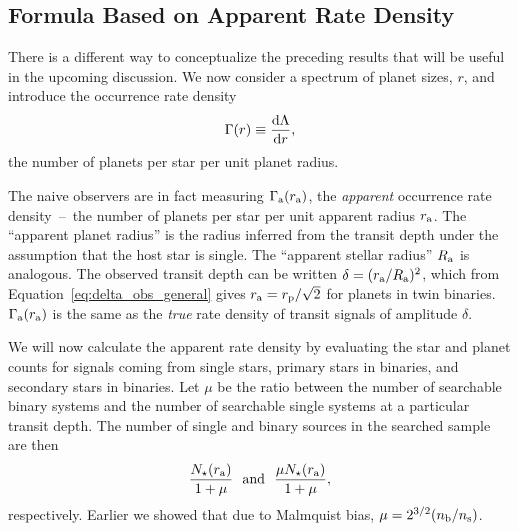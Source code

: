 \documentclass[12pt,modern]{aastex61}
\renewcommand{\a}{_{\rm a}}
\newcommand{\s}{_{\rm s}}
\newcommand{\p}{_{\rm p}}
\renewcommand{\b}{_{\rm b}}
\begin{document}
\subsection{Formula Based on Apparent Rate Density}
\label{sec:model_1_density}

There is a different way to conceptualize the preceding results that
will be useful in the upcoming discussion. We now consider a spectrum
of planet sizes, $r$, and introduce the occurrence rate density
\begin{equation}
    \Gamma(r) \equiv \frac{{\rm d}\Lambda}{{\rm d}r},
    \label{eq:rate_density_defn}
\end{equation}
the number of planets per star per unit planet radius.  

The naive observers are in fact measuring $\Gamma\a(r\a)$, the {\it
apparent} occurrence rate density~--~the number of planets per star
per unit apparent radius $r\a$.  The ``apparent planet radius'' is the
radius inferred from the transit depth under the assumption that the
host star is single. The ``apparent stellar radius'' $R\a$ is
analogous.  The observed transit depth can be written $\delta =
(r\a/R\a)^2$, which from Equation~\ref{eq:delta_obs_general} gives
$r\a=r\p/\sqrt{2}$ for planets in twin binaries.  $\Gamma\a(r\a)$ is
the same as the {\it true} rate density of transit signals of
amplitude $\delta$.

We will now calculate the apparent rate density by evaluating the star
and planet counts for signals coming from single stars, primary stars
in binaries, and secondary stars in binaries.  Let $\mu$ be the ratio
between the number of searchable binary systems and the number of
searchable single systems at a particular transit depth. The number of
single and binary sources in the searched sample are then
\begin{equation}
  \frac{N_\star(r\a)}{1+\mu}~~{\rm and}~~\frac{\mu N_\star(r\a)}{1+\mu},
  \label{eq:N_searched}
\end{equation}
respectively.  Earlier we showed that due to Malmquist bias, $\mu =
2^{3/2}(n\b/n\s)$.
\end{document}
